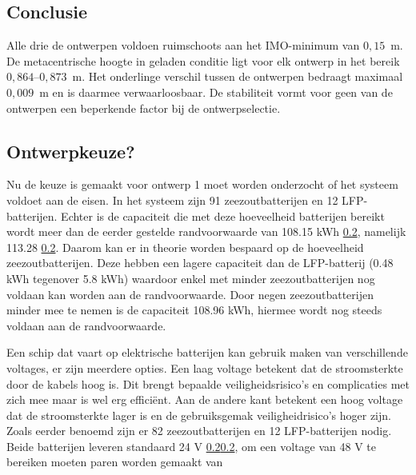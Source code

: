 \subsection{Conclusie}
\label{sec:stab_conclusie_ontwerpen}

Alle drie de ontwerpen voldoen ruimschoots aan het IMO-minimum van
$0{,}15$~m. De metacentrische hoogte in geladen conditie ligt voor elk
ontwerp in het bereik $0{,}864$--$0{,}873$~m. Het onderlinge verschil
tussen de ontwerpen bedraagt maximaal $0{,}009$~m en is daarmee
verwaarloosbaar. De stabiliteit vormt voor geen van de ontwerpen een
beperkende factor bij de ontwerpselectie.


\subsection{Ontwerpkeuze?}

Nu de keuze is gemaakt voor ontwerp 1 moet worden onderzocht of het systeem voldoet aan de eisen. In het systeem zijn 91 zeezoutbatterijen en 12 LFP-batterijen. Echter is de capaciteit die met deze hoeveelheid batterijen bereikt wordt meer dan de eerder gestelde randvoorwaarde van 108.15 kWh \ref{}, namelijk 113.28 \ref{}. Daarom kan er in theorie worden bespaard op de hoeveelheid zeezoutbatterijen. Deze hebben een lagere capaciteit dan de LFP-batterij (0.48 kWh tegenover 5.8 kWh) waardoor enkel met minder zeezoutbatterijen nog voldaan kan worden aan de randvoorwaarde. Door negen zeezoutbatterijen minder mee te nemen is de capaciteit 108.96 kWh, hiermee wordt nog steeds voldaan aan de randvoorwaarde. 

\noindent Een schip dat vaart op elektrische batterijen kan gebruik maken van verschillende voltages, er zijn meerdere opties. Een laag voltage betekent dat de stroomsterkte door de kabels hoog is. Dit brengt bepaalde veiligheidsrisico's en complicaties met zich mee maar is wel erg efficiënt. Aan de andere kant betekent een hoog voltage dat de stroomsterkte lager is en de gebruiksgemak veiligheidrisico's hoger zijn. Zoals eerder benoemd zijn er 82 zeezoutbatterijen en 12 LFP-batterijen nodig. Beide batterijen leveren standaard 24 V \ref{}\ref{}, om een voltage van 48 V te bereiken moeten paren worden gemaakt van 


